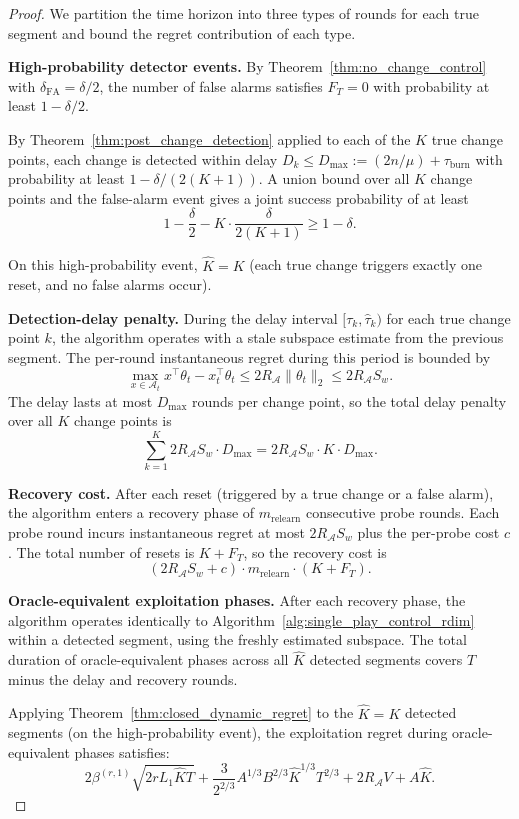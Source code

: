 \documentclass{article}
\newcommand{\cA}{\mathcal{A}}
\begin{document}
\begin{proof}
We partition the time horizon into three types of rounds for each true segment and bound the regret contribution of each type.

\textbf{High-probability detector events.}
By Theorem~\ref{thm:no_change_control} with $\delta_{\mathrm{FA}} = \delta/2$, the number of false alarms satisfies $F_T = 0$ with probability at least $1 - \delta/2$.

By Theorem~\ref{thm:post_change_detection} applied to each of the $K$ true change points, each change is detected within delay $D_k \le D_{\max} := (2n/\mu) + \tau_{\mathrm{burn}}$ with probability at least $1 - \delta/(2(K+1))$.  A union bound over all $K$ change points and the false-alarm event gives a joint success probability of at least
\[
1 - \frac{\delta}{2} - K \cdot \frac{\delta}{2(K+1)} \ge 1 - \delta.
\]

On this high-probability event, $\hat K = K$ (each true change triggers exactly one reset, and no false alarms occur).

\textbf{Detection-delay penalty.}
During the delay interval $[\tau_k, \hat\tau_k)$ for each true change point $k$, the algorithm operates with a stale subspace estimate from the previous segment.  The per-round instantaneous regret during this period is bounded by
\[
\max_{x \in \cA_t} x^\top\theta_t - x_t^\top\theta_t \le 2R_{\cA}\|\theta_t\|_2 \le 2R_{\cA} S_w.
\]
The delay lasts at most $D_{\max}$ rounds per change point, so the total delay penalty over all $K$ change points is
\[
\sum_{k=1}^K 2R_{\cA} S_w \cdot D_{\max} = 2R_{\cA} S_w \cdot K \cdot D_{\max}.
\]

\textbf{Recovery cost.}
After each reset (triggered by a true change or a false alarm), the algorithm enters a recovery phase of $m_{\mathrm{relearn}}$ consecutive probe rounds.  Each probe round incurs instantaneous regret at most $2R_{\cA} S_w$ plus the per-probe cost $c$.  The total number of resets is $K + F_T$, so the recovery cost is
\[
(2R_{\cA} S_w + c) \cdot m_{\mathrm{relearn}} \cdot (K + F_T).
\]

\textbf{Oracle-equivalent exploitation phases.}
After each recovery phase, the algorithm operates identically to Algorithm~\ref{alg:single_play_control_rdim} within a detected segment, using the freshly estimated subspace.  The total duration of oracle-equivalent phases across all $\hat K$ detected segments covers $T$ minus the delay and recovery rounds.

Applying Theorem~\ref{thm:closed_dynamic_regret} to the $\hat K = K$ detected segments (on the high-probability event), the exploitation regret during oracle-equivalent phases satisfies:
\[
2\beta^{(r,1)}\sqrt{2rL_1 \hat K T}
+ \frac{3}{2^{2/3}}A^{1/3}B^{2/3}\hat K^{1/3}T^{2/3}
+ 2R_{\cA} V + A\hat K.
\]


\end{proof}
\end{document}
